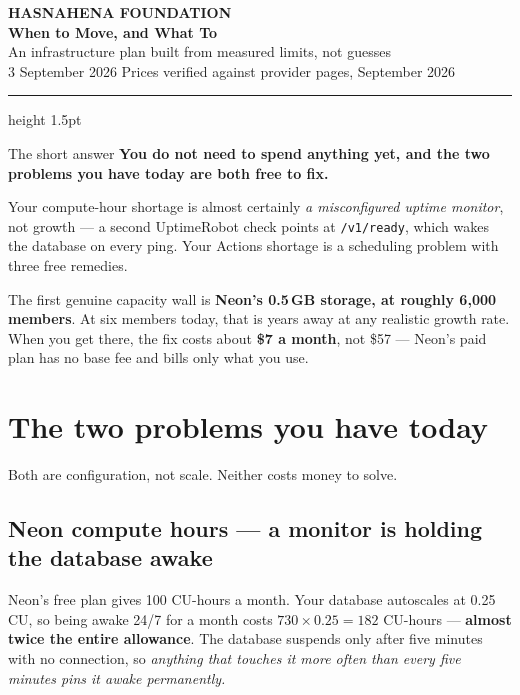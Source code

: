 \documentclass[11pt,a4paper]{article}
\begin{document}
\begin{center}
{\sffamily\bfseries\fontsize{10}{12}\selectfont\color{slate} HASNAHENA FOUNDATION}\\[7pt]
{\sffamily\bfseries\fontsize{27}{31}\selectfont\color{teal} When to Move, and What To}\\[11pt]
{\sffamily\large\color{slate} An infrastructure plan built from measured limits, not guesses}\\[6pt]
{\sffamily\footnotesize\color{slate} 3 September 2026 \quad\textperiodcentered{}\quad Prices verified against provider pages, September 2026}
\end{center}

\vspace{6pt}
\textcolor{rule}{\hrule height 1.5pt}
\vspace{10pt}

\begin{keybox}{The short answer}
\textbf{You do not need to spend anything yet, and the two problems you have today are both free to fix.}

Your compute-hour shortage is almost certainly \emph{a misconfigured uptime monitor}, not growth — a second UptimeRobot check points at \texttt{/v1/ready}, which wakes the database on every ping. Your Actions shortage is a scheduling problem with three free remedies.

The first genuine capacity wall is \textbf{Neon's 0.5\,GB storage, at roughly 6{,}000 members}. At six members today, that is years away at any realistic growth rate. When you get there, the fix costs about \textbf{\$7 a month}, not \$57 — Neon's paid plan has no base fee and bills only what you use.
\end{keybox}

\section{The two problems you have today}

Both are configuration, not scale. Neither costs money to solve.

\subsection{Neon compute hours --- a monitor is holding the database awake}

Neon's free plan gives 100 CU-hours a month. Your database autoscales at 0.25\,CU, so being awake 24/7 for a month costs $730 \times 0.25 = 182$ CU-hours --- \textbf{almost twice the entire allowance}. The database suspends only after five minutes with no connection, so \emph{anything that touches it more often than every five minutes pins it awake permanently.}
\end{document}
